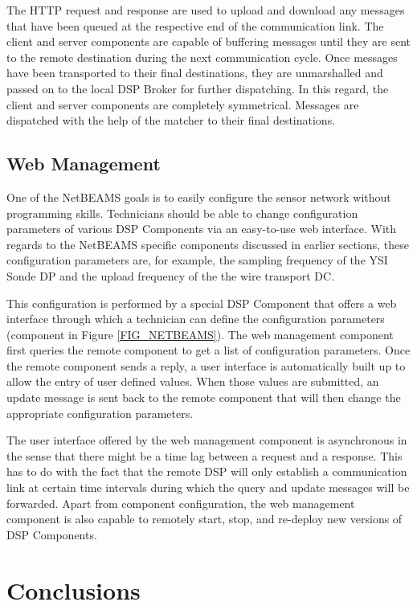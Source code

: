 \documentclass[conference]{IEEEtran}
\begin{document}
The HTTP request and response are used to upload and download any
messages that have been queued at the respective end of the
communication link. The client and server components are capable of
buffering messages until they are sent to the remote destination
during the next communication cycle. Once messages have been
transported to their final destinations, they are unmarshalled and
passed on to the local DSP Broker for further dispatching. In this
regard, the client and server components are completely symmetrical. Messages
are dispatched with the help of the matcher to their final destinations.


\subsection{Web Management}

One of the NetBEAMS goals is to easily configure the sensor
network without programming skills. Technicians should be able to
change configuration parameters of various DSP Components via an
easy-to-use web interface. With regards to the NetBEAMS specific
components discussed in earlier sections, these configuration
parameters are, for example, the sampling frequency of the YSI Sonde DP
and the upload frequency of the the wire transport DC.

This configuration is performed by a special DSP Component that
offers a web interface through which a technician can define the
configuration parameters (component  in Figure
\ref{FIG_NETBEAMS}). The web management component first queries the remote
component to get a list of configuration parameters. Once the remote
component sends a reply, a user interface is automatically built up
to allow the entry of user defined values. When those values are
submitted, an update message is sent back to the remote component that
will then change the appropriate configuration parameters.

The user interface offered by the web management component is
asynchronous in the sense that there might be a time lag between a
request and a response. This has to do with the fact that the remote
DSP will only establish a communication link at certain time intervals
during which the query and update messages will be forwarded. Apart
from component configuration, the web management component is also
capable to remotely start, stop, and re-deploy new versions of DSP
Components.

\section{Conclusions}
\label{SEC_CONCLUSION}
\end{document}
